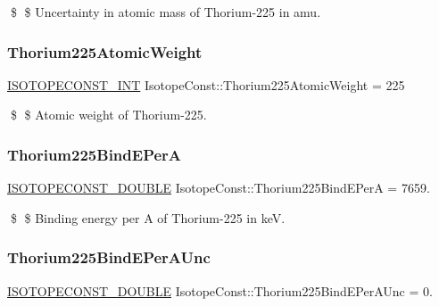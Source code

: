 \$ \$ Uncertainty in atomic mass of Thorium-\/225 in amu. \mbox{\label{group___isotope_const-_thorium-_th225_ga41173789d08d825834c8547ef202a9fe}} 
\subsubsection{\texorpdfstring{Thorium225\+Atomic\+Weight}{Thorium225AtomicWeight}}
{\footnotesize\ttfamily \mbox{\hyperlink{group___isotope_const-_macros_ga5f18360b3e99483a35c32d789e62621c}{I\+S\+O\+T\+O\+P\+E\+C\+O\+N\+S\+T\+\_\+\+I\+NT}} Isotope\+Const\+::\+Thorium225\+Atomic\+Weight = 225}

\$ \$ Atomic weight of Thorium-\/225. \mbox{\label{group___isotope_const-_thorium-_th225_ga27fb760bdf43dc6f92a0201500bf81a3}} 
\subsubsection{\texorpdfstring{Thorium225\+Bind\+E\+PerA}{Thorium225BindEPerA}}
{\footnotesize\ttfamily \mbox{\hyperlink{group___isotope_const-_macros_ga8f45a7272ce02c0b4c65c44636ed719a}{I\+S\+O\+T\+O\+P\+E\+C\+O\+N\+S\+T\+\_\+\+D\+O\+U\+B\+LE}} Isotope\+Const\+::\+Thorium225\+Bind\+E\+PerA = 7659.}

\$ \$ Binding energy per A of Thorium-\/225 in keV. \mbox{\label{group___isotope_const-_thorium-_th225_gaf5cf1664ce74df816b3dc00aa6d0e84e}} 
\subsubsection{\texorpdfstring{Thorium225\+Bind\+E\+Per\+A\+Unc}{Thorium225BindEPerAUnc}}
{\footnotesize\ttfamily \mbox{\hyperlink{group___isotope_const-_macros_ga8f45a7272ce02c0b4c65c44636ed719a}{I\+S\+O\+T\+O\+P\+E\+C\+O\+N\+S\+T\+\_\+\+D\+O\+U\+B\+LE}} Isotope\+Const\+::\+Thorium225\+Bind\+E\+Per\+A\+Unc = 0.}

